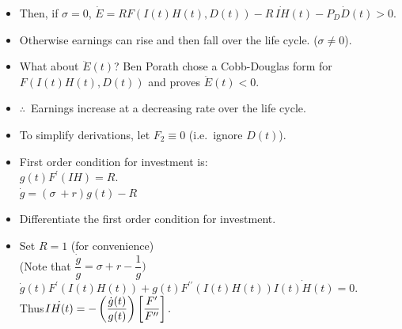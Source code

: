\documentclass[12pt,compress,handout]{beamer}  %
\begin{document}
\begin{frame}
\begin{itemize}[<+->]
\item
Then, if $\sigma =0$, $\dot{E}=RF(I(t)H(t),D(t))-R\,\dot{IH}(t)
-P_{D}\dot{D}(t)>0$.\medskip

\item
Otherwise earnings can rise and then fall over the life cycle.
($\sigma \neq 0$).\medskip

\item
What about $\ddot{E}(t)$? Ben Porath chose a Cobb-Douglas form for
$F(I(t)H(t),D(t))$ and proves $\ddot{E}(t) < 0$.\medskip

\item
$\therefore $\ Earnings increase at a
decreasing rate over the life cycle.\medskip

\item
To simplify derivations, let $F_{2} \equiv 0$ (i.e.\ ignore $D(t)$).
\end{itemize}
\end{frame}


\begin{frame}
\begin{itemize}[<+->]
\item
First order condition for investment is:\\\vspace{.2in}
$g(t)F^{\prime }(IH)=R.$\\\vspace{.1in} $\dot{g}=(\sigma \
+r)g(t)-R$\\\vspace{.2in}

\item
Differentiate the first order condition for investment.

\item
Set $R = 1$ (for convenience)\\\vspace{.2in} (Note that
$\dfrac{\dot{g}}{g}=\sigma +r-\dfrac{1}{g})$\\\vspace{.2in}
$\dot{g}(t)F^{\prime }(I(t)H(t))+g(t)F^{\prime \prime
}(I(t)H(t))\dot{I(t)H(t)}=0$.\\\vspace{.2in}
Thus\qquad $\dot{IH(t)}=-\left( \dfrac{\dot{g}(t)}{g(t)}\right) \left[ \dfrac{%
F^{\prime }}{F^{\prime \prime }}\right] .$
\end{itemize}
\end{frame}
\end{document}
